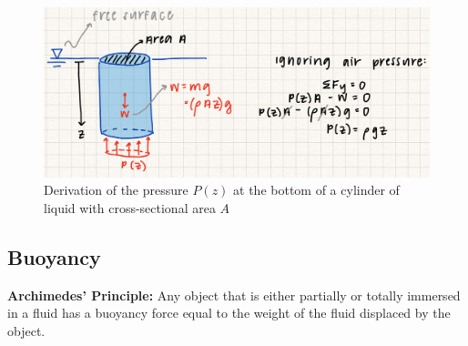 \begin{figure}[!h]
\centering
\includegraphics[angle=0, width=\textwidth]{FluidFigures/FluidDerivation.jpg}
\vspace{-2mm}
\caption{\small Derivation of the pressure $P(z)$ at the bottom of a cylinder of liquid with cross-sectional area $A$}
\vspace{-3mm}
\label{Fig:FluidDerivation}
\end{figure}

\subsection{Buoyancy}

\textbf{Archimedes' Principle:} Any object that is either partially or totally immersed in a fluid has a buoyancy force equal to the weight of the fluid displaced by the object. 


